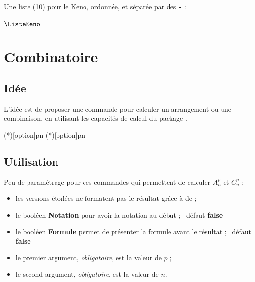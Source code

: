 \documentclass[a4paper,french,11pt]{article}
\newcommand\ctex[1]{\tcbox[vignettelatex]{#1}}
\newcommand\Cle[1]{{\bfseries\sffamily\textlangle #1\textrangle}}
\begin{document}
\begin{codetex}[]
Une liste (10) pour le Keno\textcopyright, ordonnée, et séparée par des \texttt{-} :

\TirageAleatoireEntiers[ValMin=1,ValMax=70,NbVal=10,Tri=croissant,Sep={-}]{\ListeKeno}
$\ListeKeno$

\setsepchar{-}\readlist*\KENO{\ListeKeno}\showitems{\KENO}
\end{codetex}

\newpage

\section{Combinatoire}\label{combinatoire}

\subsection{Idée}

\begin{codeidee}
L'idée est de proposer une commande pour calculer un arrangement ou une combinaison, en utilisant les capacités de calcul du package \ctex{xfp}.
\end{codeidee}

\begin{codetex}
\Arrangement(*)[option]{p}{n}
\Combinaison(*)[option]{p}{n}
\end{codetex}

\subsection{Utilisation}

\begin{codecles}
Peu de paramétrage pour ces commandes qui permettent de calculer $A_n^p$ et $C_n^p$ :

\begin{itemize}
	\item les versions étoilées ne formatent pas le résultat grâce à \ctex{\textbackslash num} de \ctex{sinuitx} ;
	\item le booléen \Cle{Notation} pour avoir la notation au début ; \hfill~défaut \Cle{false}
	\item le booléen \Cle{Formule} permet de présenter la formule avant le résultat ; \hfill~défaut \Cle{false}
	\item le premier argument, \textit{obligatoire}, est la valeur de $p$ ;
	\item le second argument, \textit{obligatoire}, est la valeur de $n$.
\end{itemize}
\end{codecles}
\end{document}
